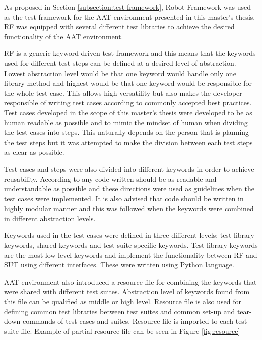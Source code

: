 As proposed in Section \ref{subsection:test framework}, Robot Framework was used as the test framework for the AAT environment presented in this master's thesis. RF was equipped with several different test libraries to achieve the desired functionality of the AAT environment.

RF is a generic keyword-driven test framework and this means that the keywords used for different test steps can be defined at a desired level of abstraction. Lowest abstraction level would be that one keyword would handle only one library method and highest would be that one keyword would be responsible for the whole test case. This allows high versatility but also makes the developer responsible of writing test cases according to commonly accepted best practices. Test cases developed in the scope of this master's thesis were developed to be as human readable as possible and to mimic the mindset of human when dividing the test cases into steps. This naturally depends on the person that is planning the test steps but it was attempted to make the division between each test steps as clear as possible.

Test cases and steps were also divided into different keywords in order to achieve reusability. According to \cite{clean-code} any code written should be as readable and understandable as possible and these directions were used as guidelines when the test cases were implemented. It is also advised that code should be written in highly modular manner and this was followed when the keywords were combined in different abstraction levels.

Keywords used in the test cases were defined in three different levels: test library keywords, shared keywords and test suite specific keywords. Test library keywords are the most low level keywords and implement the functionality between RF and SUT using different interfaces. These were written using Python language. 

AAT environment also introduced a resource file for combining the keywords that were shared with different test suites. Abstraction level of keywords found from this file can be qualified as middle or high level. Resource file is also used for defining common test libraries between test suites and common set-up and tear-down commands of test cases and suites. Resource file is imported to each test suite file. Example of partial resource file can be seen in Figure \ref{fig:resource}

